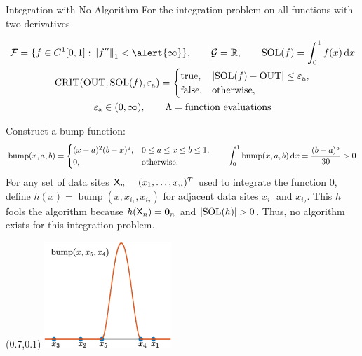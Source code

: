 \documentclass[10pt,compress,xcolor={usenames,dvipsnames},aspectratio=169]{beamer}
\DeclareMathOperator{\BUMP}{bump}
\DeclareMathOperator{\SOL}{SOL}
\DeclareMathOperator{\OUT}{OUT}
\DeclareMathOperator{\CRIT}{CRIT}
\newcommand{\ttrue}{\textup{true}}
\newcommand{\tfalse}{\textup{false}}
\newcommand{\tolabs}{\varepsilon_{\textup{a}}}
\begin{document}
\begin{frame}[fragile, label=integnoalg]{Integration with No Algorithm  \hyperlink{difference}{}}
	\vspace{-4ex}
	For the integration problem on \alert{all functions with two derivatives}
	\vspace{-1ex}
	\begin{minipage}{0.65\textwidth}
		\begin{gather*}
		\cf = \{f \in C^1[0,1] : \norm[1]{f''} < \alert{\infty}\}, \qquad 
		\cg  = \reals,  \qquad
		\SOL(f) = \int_0^1 f(x) \, \dif x  \\
		\CRIT(\OUT, \SOL(f),\tolabs)  = \begin{cases} \ttrue, & \abs{\SOL(f) - \OUT} \le \tolabs, \\
			\tfalse, & \text{otherwise}, 
		\end{cases} \\
		\tolabs \in (0,\infty), \qquad
		\Lambda  = \text{function evaluations}
	\end{gather*}
	\end{minipage}

Construct a bump function:
	\begin{equation*}
		\BUMP(x,a,b) = \begin{cases} (x - a)^2(b-x)^2, & 0 \le a \le x \le b \le 1, \\
			0, & \text{otherwise},
		\end{cases}
	\qquad
	\int_0^1 \BUMP(x,a,b) \, \dif x  =  \frac{(b-a)^5}{30} > 0
	\end{equation*}
For any set of data sites $\mathsf{X}_n = (x_1, \ldots, x_n)^T$ used to integrate the function $0$, define $h(x) = \BUMP(x,x_{i_1}, x_{i_2})$ for adjacent data sites $x_{i_1}$ and $x_{i_2}$.  This $h$ \alert{fools} the algorithm because $h(\mathsf{X}_n) =  \boldsymbol{0}_n$ and $\abs{\SOL(h)} > 0$.  Thus, no algorithm exists for this integration problem.

	\begin{textblock}{0.3}(0.7,0.1)
		\includegraphics[height=4cm]{IntegrationBump.eps}
	\end{textblock}
	
	
\end{frame}
\end{document}
